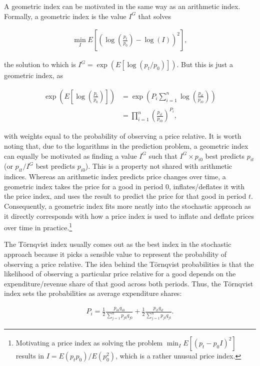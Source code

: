 \documentclass[]{article}
\begin{document}
A geometric index can be motivated in the same way as an arithmetic index. Formally, a geometric index is the value \(I^{G}\) that solves

\begin{align*}
\min_{I} E\left[\left(\log\left(\frac{p_{t}}{p_{0}}\right) - \log(I) \right)^{2}\right],
\end{align*}

the solution to which is \(I^{G} = \exp(E[\log(p_{t} / p_{0})])\). But this is just a geometric index, as

\begin{align*}
\exp\left(E\left[\log\left(\frac{p_{t}}{p_{0}}\right)\right]\right) &= \exp\left(P_{i} \sum_{i = 1}^{n} \log\left(\frac{p_{it}}{p_{i0}}\right)\right) \\
&= \prod_{i = 1}^{n} \left(\frac{p_{it}}{p_{i0}}\right)^{P_{i}},
\end{align*}

with weights equal to the probability of observing a price relative. It is worth noting that, due to the logarithms in the prediction problem, a geometric index can equally be motivated as finding a value \(I^{G}\) such that \(I^{G} \times p_{i0}\) best predicts \(p_{it}\) (or \(p_{it} / I^{G}\) best predicts \(p_{i0}\)). This is a property not shared with arithmetic indices. Whereas an arithmetic index predicts price changes over time, a geometric index takes the price for a good in period 0, inflates/deflates it with the price index, and uses the result to predict the price for that good in period \(t\). Consequently, a geometric index fits more neatly into the stochastic approach as it directly corresponds with how a price index is used to inflate and deflate prices over time in practice.\footnote{Motivating a price index as solving the problem \(\min_{I} E[(p_{t} - p_{0} I)^{2}]\) results in \(I = E(p_{t} p_{0}) / E(p_{0}^{2})\), which is a rather unusual price index.}

The Törnqvist index usually comes out as the best index in the stochastic approach because it picks a sensible value to represent the probability of observing a price relative. The idea behind the Törnqvist probabilities is that the likelihood of observing a particular price relative for a good depends on the expenditure/revenue share of that good across both periods. Thus, the Törnqvist index sets the probabilities as average expenditure shares:

\begin{align*}
P_{i} = \frac{1}{2} \frac{p_{i0}q_{i0}}{\sum_{j = 1}^{n} p_{j0}q_{j0}} + \frac{1}{2} \frac{p_{it}q_{it}}{\sum_{j = 1}^{n} p_{jt}q_{jt}}.
\end{align*}
\end{document}
